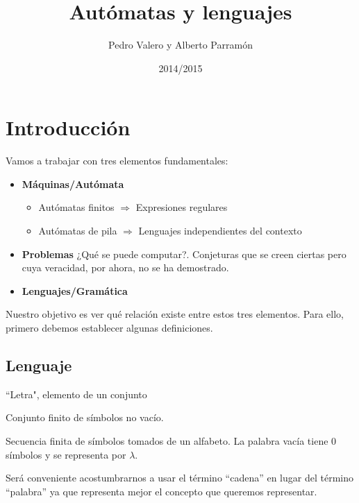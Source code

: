 \documentclass{apuntes}
\title{Autómatas y lenguajes}
\author{Pedro Valero y Alberto Parramón}
\date{2014/2015}
\begin{document}
\pagestyle{plain}

\maketitle
\tableofcontents
\newpage

\printindex

\chapter{Introducción}
Vamos a trabajar con tres elementos fundamentales:
\begin{itemize}
\item \textbf{Máquinas/Autómata}
\begin{itemize}
\item Autómatas finitos $\Rightarrow$ Expresiones regulares
\item Autómatas de pila $\Rightarrow$ Lenguajes independientes del contexto
\end{itemize}
\item \textbf{Problemas} ¿Qué se puede computar?. Conjeturas que se creen ciertas pero cuya veracidad, por ahora, no se ha demostrado.

\item \textbf{Lenguajes/Gramática}
\end{itemize}

Nuestro objetivo es ver qué relación existe entre estos tres elementos. Para ello, primero debemos establecer algunas definiciones.

\section{Lenguaje}
\begin{defn}[Símbolo]
``Letra", elemento de un conjunto
\end{defn}

\begin{defn}[Alfabeto]
Conjunto finito de símbolos no vacío.
\end{defn}

\begin{defn}
Secuencia finita de símbolos tomados de un alfabeto.
La palabra vacía tiene 0 símbolos y se representa por $\lambda$.
\end{defn}

Será conveniente acostumbrarnos a usar el término ``cadena'' en lugar del término ``palabra'' ya que representa mejor el concepto que queremos representar.
\end{document}
